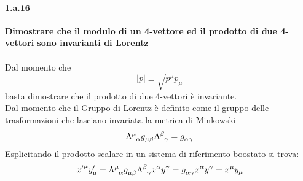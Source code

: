 \documentclass[twoside]{article}
\begin{document}
\paragraph{1.a.16} \textbf{Dimostrare che il modulo di un 4-vettore ed il prodotto di due 4-vettori sono
invarianti di Lorentz}\\ \\
Dal momento che 
\begin{equation*}
    |p|\equiv\sqrt{p^{\mu}p_{\mu}}
\end{equation*}
basta dimostrare che il prodotto di due 4-vettori è invariante.
\\
Dal momento che il Gruppo di Lorentz è definito come il gruppo delle trasformazioni che lasciano invariata la metrica di Minkowski
\begin{equation*}
    \tensor{\Lambda}{^{\mu}_{\alpha}}\tensor{g}{_{\mu}_{\beta}}\tensor{\Lambda}{^{\beta}_{\gamma}}=\tensor{g}{_{\alpha}_{\gamma}}
\end{equation*}
Esplicitando il prodotto scalare in un sistema di riferimento boostato si trova:
\begin{equation*}
    {x'} ^{\mu}y' _{\mu}=\tensor{\Lambda}{^{\mu}_{\alpha}}\tensor{g}{_{\mu}_{\beta}}\tensor{\Lambda}{^{\beta}_{\gamma}}x^{\alpha}y^{\gamma}=\tensor{g}{_{\alpha}_{\gamma}}x^{\alpha}y^{\gamma}=x^{\mu}y_{\mu}
\end{equation*}
\end{document}
